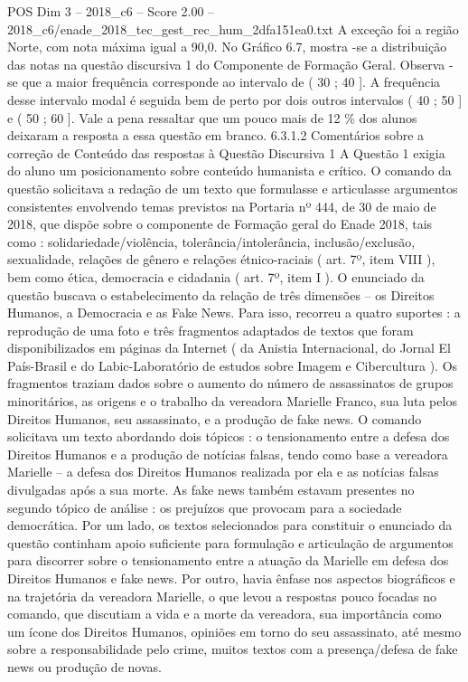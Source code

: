 \begin{textsample}{POS Dim 3 – 2018\_c6 – Score 2.00 – 2018\_c6/enade\_2018\_tec\_gest\_rec\_hum\_2dfa151ea0.txt}
A exceção foi a região Norte, com nota máxima igual a 90,0.
No Gráfico 6.7, mostra -se a distribuição das notas na questão discursiva 1 do Componente de Formação Geral.
Observa -se que a maior frequência corresponde ao intervalo de ( 30 ; 40 ].
A frequência desse intervalo modal é seguida bem de perto por dois outros intervalos ( 40 ; 50 ] e ( 50 ; 60 ].
Vale a pena ressaltar que um pouco mais de 12 \% dos alunos deixaram a resposta a essa questão em branco. 6.3.1.2 Comentários sobre a correção de Conteúdo das respostas à Questão Discursiva 1 A Questão 1 exigia do aluno um posicionamento sobre conteúdo humanista e crítico.
O comando da questão solicitava a redação de um texto que formulasse e articulasse argumentos consistentes envolvendo temas previstos na Portaria nº 444, de 30 de maio de 2018, que dispõe sobre o componente de Formação geral do Enade 2018, tais como : solidariedade/violência, tolerância/intolerância, inclusão/exclusão, sexualidade, relações de gênero e relações étnico-raciais ( art. 7º, item VIII ), bem como ética, democracia e cidadania ( art. 7º, item I ).
O enunciado da questão buscava o estabelecimento da relação de três dimensões – os Direitos Humanos, a Democracia e as Fake News.
Para isso, recorreu a quatro suportes : a reprodução de uma foto e três fragmentos adaptados de textos que foram disponibilizados em páginas da Internet ( da Anistia Internacional, do Jornal El País-Brasil e do Labic-Laboratório de estudos sobre Imagem e Cibercultura ).
Os fragmentos traziam dados sobre o aumento do número de assassinatos de grupos minoritários, as origens e o trabalho da vereadora Marielle Franco, sua luta pelos Direitos Humanos, seu assassinato, e a produção de fake news.
O comando solicitava um texto abordando dois tópicos : o tensionamento entre a defesa dos Direitos Humanos e a produção de notícias falsas, tendo como base a vereadora Marielle – a defesa dos Direitos Humanos realizada por ela e as notícias falsas divulgadas após a sua morte.
As fake news também estavam presentes no segundo tópico de análise : os prejuízos que provocam para a sociedade democrática.
Por um lado, os textos selecionados para constituir o enunciado da questão continham apoio suficiente para formulação e articulação de argumentos para discorrer sobre o tensionamento entre a atuação da Marielle em defesa dos Direitos Humanos e fake news.
Por outro, havia ênfase nos aspectos biográficos e na trajetória da vereadora Marielle, o que levou a respostas pouco focadas no comando, que discutiam a vida e a morte da vereadora, sua importância como um ícone dos Direitos Humanos, opiniões em torno do seu assassinato, até mesmo sobre a responsabilidade pelo crime, muitos textos com a presença/defesa de fake news ou produção de novas.

\end{textsample}
